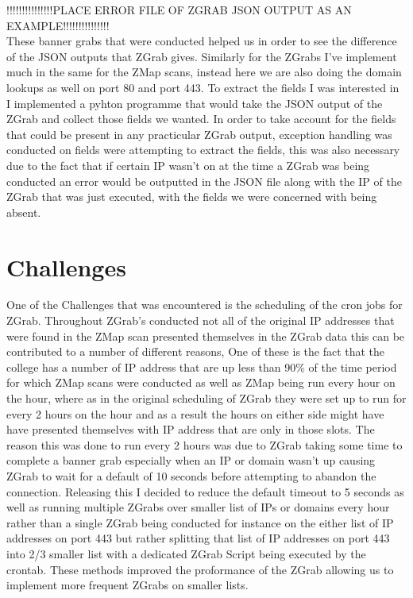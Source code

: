 \documentclass[a4wide,leqno,12pt]{report}
\begin{document}
!!!!!!!!!!!!!!!PLACE ERROR FILE OF ZGRAB JSON OUTPUT AS AN EXAMPLE!!!!!!!!!!!!!!!\\

These banner grabs that were conducted helped us in order to see the difference of the JSON outputs that ZGrab gives. Similarly for the ZGrabs I've implement much in the same for the ZMap scans, instead here we are also doing the domain lookups as well on port 80 and port 443. To extract the fields I was interested in I implemented a pyhton programme that would take the JSON output of the ZGrab and collect those fields we wanted. In order to take account for the fields that could be present in any practicular ZGrab output, exception handling was conducted on fields were attempting to extract the fields, this was also necessary due to the fact that if certain IP wasn't on at the time a ZGrab was being conducted an error would be outputted in the JSON file along with the IP of the ZGrab that was just executed, with the fields we were concerned with being absent.
\section{Challenges}
One of the Challenges that was encountered is the scheduling of the cron jobs for ZGrab. Throughout ZGrab's conducted not all of the original IP addresses that were found in the ZMap scan presented themselves in the ZGrab data this can be contributed to a number of different reasons, One of these is the fact that the college has a number of IP address that are up less than 90\% of the time period for which ZMap scans were conducted as well as ZMap being run every hour on the hour, where as in the original scheduling of ZGrab they were set up to run for every 2 hours on the hour and as a result the hours on either side might have have presented themselves with IP address that are only in those slots. The reason this was done to run every 2 hours was due to ZGrab taking some time to complete a banner grab especially when an IP or domain wasn't up causing ZGrab to wait for a default of 10 seconds before attempting to abandon the connection. Releasing this I decided to reduce the default timeout to 5 seconds as  well as running multiple ZGrabs over smaller list of IPs or domains every hour rather than a single ZGrab being conducted for instance on the either list of IP addresses on port 443 but rather splitting that list of IP addresses on port 443 into 2/3 smaller list with a dedicated ZGrab Script being executed by the crontab. These methods improved the proformance of the ZGrab allowing us to implement more frequent ZGrabs on smaller lists.
\end{document}
